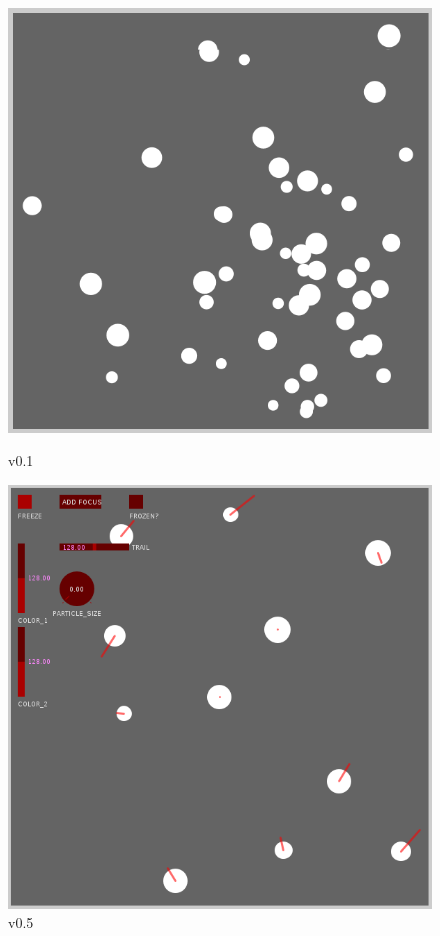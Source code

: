 \documentclass[12pt]{article}
\begin{document}
\begin{figure}[H]
  \centering
  \begin{minipage}{.5\textwidth}
    \centering
    \includegraphics[scale=0.35]{firstver}
    \caption{v0.1}
  \end{minipage}%
  \begin{minipage}{.5\textwidth}
    \centering
    \includegraphics[scale=0.35]{secondver}
    \caption{v0.5}
    \end{minipage}%
\end{figure}
    
\end{document}
